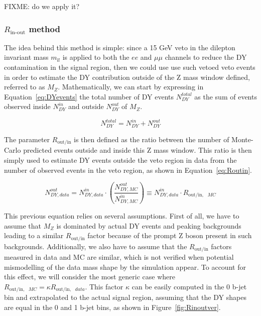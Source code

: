 \documentclass[a4paper, 10pt, openright]{report}
\begin{document}
\color{red} FIXME: do we apply it? \color{black}

\subsubsection{$R_{\text{in-out}}$ method} \label{subsection:rinout}

The idea behind this method is simple: since a 15 GeV veto in the dilepton invariant mass $m_{ll}$ is applied to both the $ee$ and $\mu \mu$ channels to reduce the \ac{DY} contamination in the signal region, then we could use use such vetoed veto events in order to estimate the \ac{DY} contribution outside of the Z mass window defined, referred to as $M_Z$. Mathematically, we can start by expressing in Equation~\ref{eq:DYevents} the total number of \ac{DY} events $N_{DY}^{total}$ as the sum of events observed inside $N_{DY}^{in}$ and outside $N_{DY}^{out}$ of $M_Z$.

\begin{equation}
\label{eq:DYevents}
N_{DY}^{total} = N_{DY}^{in} + N_{DY}^{out}
\end{equation}

The parameter $R_{\text{out/in}}$ is then defined as the ratio between the number of Monte-Carlo predicted events outside and inside this Z mass window. This ratio is then simply used to estimate DY events outside the veto region in data from the number of observed events in the veto region, as shown in Equation~\ref{eq:Routin}.

\begin{equation}
\label{eq:Routin}
N^{out}_{DY, data} = N^{in}_{DY, data} \cdot \left (\frac{N^{out}_{DY, MC}}{N^{in}_{DY, MC}} \right ) \equiv  N^{in}_{DY, data} \cdot R_{\text{out/in},\text{ } MC}
\end{equation}

This previous equation relies on several assumptions. First of all, we have to assume that $M_Z$ is dominated by actual \ac{DY} events and peaking backgrounds leading to a similar $R_{\text{out/in}}$ factor because of the prompt Z boson present in such backgrounds. Additionally, we also have to assume that the $R_{\text{out/in}}$ factors measured in data and \ac{MC} are similar, which is not verified when potential mismodelling of the data mass shape by the simulation appear. To account for this effect, we will consider the most generic case where $R_{\text{out/in},\text{ } MC} = \kappa R_{\text{out/in},\text{ } data}$. This factor $\kappa$ can be easily computed in the 0 b-jet bin and extrapolated to the actual signal region, assuming that the DY shapes are equal in the 0 and 1 b-jet bins, as shown in Figure~\ref{fig:Rinoutver}.
\end{document}
